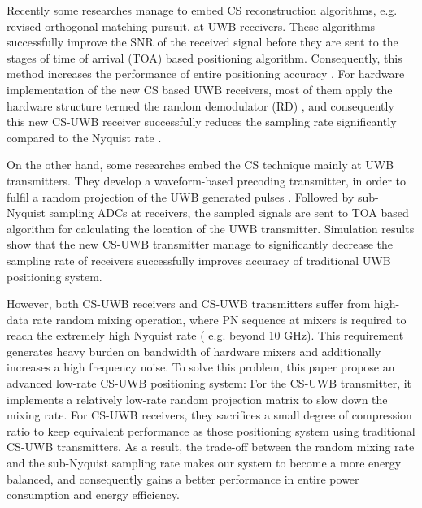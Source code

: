 Recently some researches manage to embed CS reconstruction algorithms, e.g. revised orthogonal matching pursuit, at UWB receivers. These algorithms successfully improve the SNR of the received signal before they are sent to the stages of time of arrival (TOA) based positioning algorithm. Consequently, this method increases the performance of entire positioning accuracy \cite{banitalebi2014compressive}. For hardware implementation of the new CS based UWB receivers, most of them apply the hardware structure termed the random demodulator (RD) \cite{kirolos2006analog}, and consequently this new CS-UWB receiver successfully reduces the sampling rate significantly compared to the Nyquist rate \cite{yang2011compressive}.

On the other hand, some researches embed the CS technique mainly at UWB transmitters. They develop a waveform-based precoding transmitter, in order to fulfil a random projection of the UWB generated pulses \cite{zhang2009compressed}. Followed by sub-Nyquist sampling ADCs at receivers, the sampled signals are sent to TOA based algorithm for calculating the location of the UWB transmitter. Simulation results show that the new CS-UWB transmitter manage to significantly decrease the sampling rate of receivers successfully improves accuracy of traditional UWB positioning system. 

However, both CS-UWB receivers and CS-UWB transmitters suffer from high-data rate random mixing operation, where PN sequence at mixers is required to reach the extremely high Nyquist rate ( e.g. beyond 10 GHz). This requirement generates heavy burden on bandwidth of hardware mixers and additionally increases a high frequency noise. To solve this problem, this paper propose an advanced low-rate CS-UWB positioning system: For the CS-UWB transmitter, it implements a relatively low-rate random projection matrix to slow down the mixing rate. For CS-UWB receivers, they sacrifices a small degree of compression ratio to keep equivalent performance as those positioning system using traditional CS-UWB transmitters. As a result, the trade-off between the random mixing rate and the sub-Nyquist sampling rate makes our system to become a more energy balanced, and consequently gains a better performance in entire power consumption and energy efficiency.  

